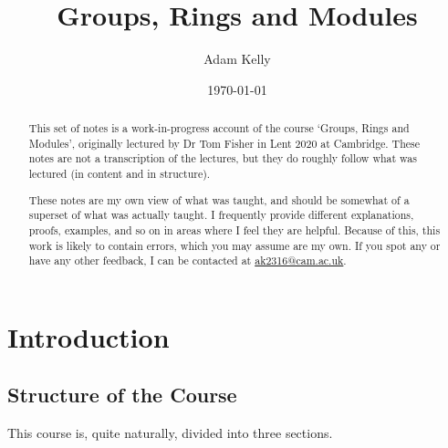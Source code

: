 \documentclass[a4paper]{scrreprt}
\title{Groups, Rings and Modules}
\author{Adam Kelly}
\date{\today}
\begin{document}
\maketitle

\begin{abstract}
	

	This set of notes is a work-in-progress account of the course `Groups, Rings and Modules', originally lectured by Dr Tom Fisher in Lent 2020 at Cambridge. These notes are not a transcription of the lectures, but they do roughly follow what was lectured (in content and in structure).

	These notes are my own view of what was taught, and should be somewhat of a superset of what was actually taught. I frequently provide different explanations, proofs, examples, and so on in areas where I feel they are helpful. Because of this, this work is likely to contain errors, which you may assume are my own. If you spot any or have any other feedback, I can be contacted at \href{mailto:ak2316@cam.ac.uk}{ak2316@cam.ac.uk}.



\end{abstract}

\tableofcontents

\clearpage
\chapter{Introduction}



\section{Structure of the Course}

This course is, quite naturally, divided into three sections.
\end{document}
